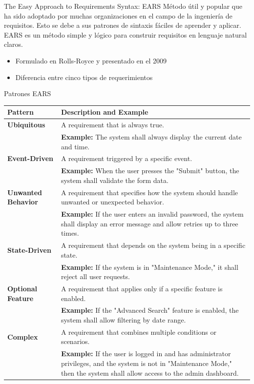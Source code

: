 \documentclass[
  24pt, %
  aspectratio=169, %
]{beamer}
\begin{document}
\begin{frame}{The Easy Approach to Requirements Syntax: EARS}
  Método útil y popular que ha sido adoptado por muchas organizaciones en el campo de la ingeniería de requisitos. Esto se debe a sus patrones de sintaxis fáciles de aprender y aplicar. EARS es un método simple y lógico para construir requisitos en lenguaje natural claros.\\
  \vspace{1cm}
  \begin{itemize}
  \item Formulado en Rolls-Royce y presentado en el 2009
  \item Diferencia entre cinco tipos de requerimientos
  \end{itemize}
  
\end{frame}

\begin{frame}{Patrones EARS}

  \tiny{
    \begin{table}[h!]
\centering
\begin{tabular}{|>{\raggedright\arraybackslash}p{3cm}|>{\raggedright\arraybackslash}p{8cm}|}
\hline
\textbf{Pattern} & \textbf{Description and Example} \\
\hline
\textbf{Ubiquitous} & 
A requirement that is always true. \\
& \textbf{Example:} The system shall always display the current date and time. \\
\hline
\textbf{Event-Driven} & 
A requirement triggered by a specific event. \\
& \textbf{Example:} When the user presses the "Submit" button, the system shall validate the form data. \\
\hline
\textbf{Unwanted Behavior} & 
A requirement that specifies how the system should handle unwanted or unexpected behavior. \\
& \textbf{Example:} If the user enters an invalid password, the system shall display an error message and allow retries up to three times. \\
\hline
\textbf{State-Driven} & 
A requirement that depends on the system being in a specific state. \\
& \textbf{Example:} If the system is in "Maintenance Mode," it shall reject all user requests. \\
\hline
\textbf{Optional Feature} & 
A requirement that applies only if a specific feature is enabled. \\
& \textbf{Example:} If the "Advanced Search" feature is enabled, the system shall allow filtering by date range. \\
\hline
\textbf{Complex} & 
A requirement that combines multiple conditions or scenarios. \\
& \textbf{Example:} If the user is logged in and has administrator privileges, and the system is not in "Maintenance Mode," then the system shall allow access to the admin dashboard. \\
\hline
\end{tabular}
\end{table}
  }
\end{frame}
\end{document}
